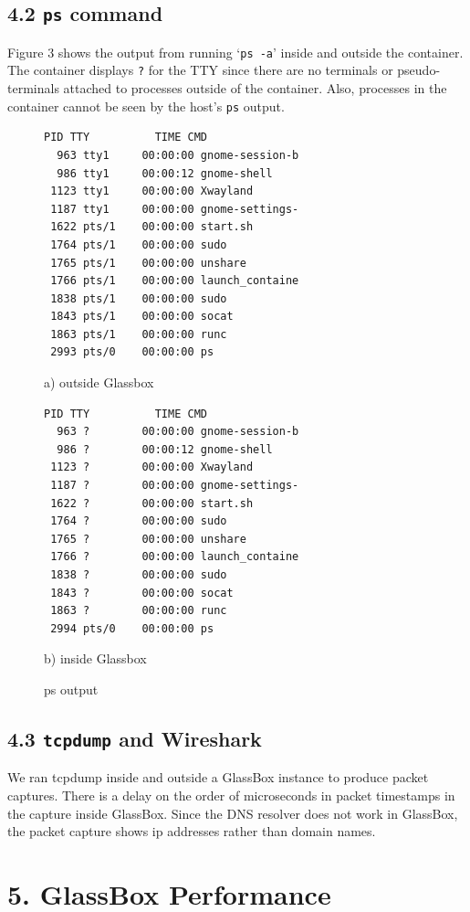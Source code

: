 \documentclass{proc}
\begin{document}
\subsection*{4.2 \texttt{ps} command}
Figure 3 shows the output from running `\texttt{ps -a}' inside and outside the container. The container displays \texttt{?} for the TTY since there are no terminals or pseudo-terminals attached to processes outside of the container. Also, processes in the container cannot be seen by the host's \texttt{ps} output.
 \begin{figure}[h]
\begin{lstlisting}[linewidth=\linewidth]
  PID TTY          TIME CMD
  963 tty1     00:00:00 gnome-session-b
  986 tty1     00:00:12 gnome-shell
 1123 tty1     00:00:00 Xwayland
 1187 tty1     00:00:00 gnome-settings-
 1622 pts/1    00:00:00 start.sh
 1764 pts/1    00:00:00 sudo
 1765 pts/1    00:00:00 unshare
 1766 pts/1    00:00:00 launch_containe
 1838 pts/1    00:00:00 sudo
 1843 pts/1    00:00:00 socat
 1863 pts/1    00:00:00 runc
 2993 pts/0    00:00:00 ps
 \end{lstlisting}
\hspace{7.5em} a) outside Glassbox
 \begin{lstlisting}[linewidth=\linewidth]
  PID TTY          TIME CMD
  963 ?        00:00:00 gnome-session-b
  986 ?        00:00:12 gnome-shell
 1123 ?        00:00:00 Xwayland
 1187 ?        00:00:00 gnome-settings-
 1622 ?        00:00:00 start.sh
 1764 ?        00:00:00 sudo
 1765 ?        00:00:00 unshare
 1766 ?        00:00:00 launch_containe
 1838 ?        00:00:00 sudo
 1843 ?        00:00:00 socat
 1863 ?        00:00:00 runc
 2994 pts/0    00:00:00 ps
\end{lstlisting}
\hspace{7.5em} b) inside Glassbox
 \caption{ps output}
\end{figure}

\subsection*{4.3 \texttt{tcpdump} and Wireshark}
We ran tcpdump inside and outside a GlassBox instance to produce packet captures. There is a delay on the order of microseconds in packet timestamps in the capture inside GlassBox. Since the DNS resolver does not work in GlassBox, the packet capture shows ip addresses rather than domain names.

\section*{5. GlassBox Performance}
\end{document}
